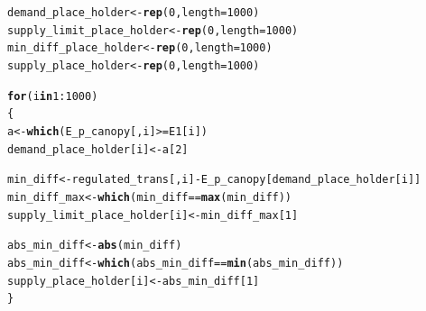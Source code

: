 \documentclass[a4paper]{article}\usepackage[]{graphicx}\usepackage[]{color}
\makeatletter
\newcommand{\hlnum}[1]{\textcolor[rgb]{0.686,0.059,0.569}{#1}}%
\newcommand{\hlopt}[1]{\textcolor[rgb]{0,0,0}{#1}}%
\newcommand{\hlstd}[1]{\textcolor[rgb]{0.345,0.345,0.345}{#1}}%
\newcommand{\hlkwa}[1]{\textcolor[rgb]{0.161,0.373,0.58}{\textbf{#1}}}%
\newcommand{\hlkwb}[1]{\textcolor[rgb]{0.69,0.353,0.396}{#1}}%
\newcommand{\hlkwc}[1]{\textcolor[rgb]{0.333,0.667,0.333}{#1}}%
\newcommand{\hlkwd}[1]{\textcolor[rgb]{0.737,0.353,0.396}{\textbf{#1}}}%
\newenvironment{kframe}{%
 \def\at@end@of@kframe{}%
 \ifinner\ifhmode%
  \def\at@end@of@kframe{\end{minipage}}%
  \begin{minipage}{\columnwidth}%
 \fi\fi%
 \def\FrameCommand##1{\hskip\@totalleftmargin \hskip-\fboxsep
 \colorbox{shadecolor}{##1}\hskip-\fboxsep
     \hskip-\linewidth \hskip-\@totalleftmargin \hskip\columnwidth}%
 \MakeFramed {\advance\hsize-\width
   \@totalleftmargin\z@ \linewidth\hsize
   \@setminipage}}%
 {\par\unskip\endMakeFramed%
 \at@end@of@kframe}
\newenvironment{knitrout}{}{} %
\makeatother
\begin{document}
\begin{knitrout}
\color{fgcolor}\begin{kframe}
\begin{alltt}
\hlstd{demand_place_holder} \hlkwb{<-} \hlkwd{rep}\hlstd{(}\hlnum{0}\hlstd{,} \hlkwc{length}\hlstd{=}\hlnum{1000}\hlstd{)}
\hlstd{supply_limit_place_holder} \hlkwb{<-} \hlkwd{rep}\hlstd{(}\hlnum{0}\hlstd{,} \hlkwc{length}\hlstd{=}\hlnum{1000}\hlstd{)}
\hlstd{min_diff_place_holder} \hlkwb{<-} \hlkwd{rep}\hlstd{(}\hlnum{0}\hlstd{,} \hlkwc{length}\hlstd{=}\hlnum{1000}\hlstd{)}
\hlstd{supply_place_holder} \hlkwb{<-} \hlkwd{rep}\hlstd{(}\hlnum{0}\hlstd{,} \hlkwc{length}\hlstd{=}\hlnum{1000}\hlstd{)}

\hlkwa{for}\hlstd{(i} \hlkwa{in} \hlnum{1}\hlopt{:}\hlnum{1000}\hlstd{)}
\hlstd{\{}
    \hlstd{a} \hlkwb{<-}\hlkwd{which}\hlstd{(E_p_canopy[,i]} \hlopt{>=} \hlstd{E1[i])}
    \hlstd{demand_place_holder[i]} \hlkwb{<-}\hlstd{a[}\hlnum{2}\hlstd{]}

    \hlstd{min_diff} \hlkwb{<-} \hlstd{regulated_trans[,i]} \hlopt{-} \hlstd{E_p_canopy[demand_place_holder[i]]}
    \hlstd{min_diff_max} \hlkwb{<-} \hlkwd{which}\hlstd{(min_diff} \hlopt{==} \hlkwd{max}\hlstd{(min_diff))}
    \hlstd{supply_limit_place_holder[i]} \hlkwb{<-} \hlstd{min_diff_max[}\hlnum{1}\hlstd{]}

    \hlstd{abs_min_diff} \hlkwb{<-} \hlkwd{abs}\hlstd{(min_diff)}
    \hlstd{abs_min_diff} \hlkwb{<-} \hlkwd{which}\hlstd{(abs_min_diff} \hlopt{==} \hlkwd{min}\hlstd{(abs_min_diff))}
    \hlstd{supply_place_holder[i]} \hlkwb{<-} \hlstd{abs_min_diff[}\hlnum{1}\hlstd{]}
\hlstd{\}}
\end{alltt}
\end{kframe}
\end{knitrout}
\end{document}
